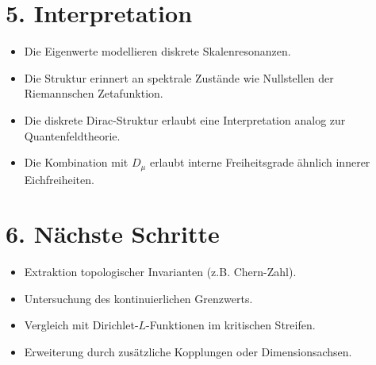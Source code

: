 \documentclass[11pt]{article}
\begin{document}
\section*{5. Interpretation}
\begin{itemize}
\item Die Eigenwerte modellieren diskrete Skalenresonanzen.
\item Die Struktur erinnert an spektrale Zustände wie Nullstellen der Riemannschen Zetafunktion.
\item Die diskrete Dirac-Struktur erlaubt eine Interpretation analog zur Quantenfeldtheorie.
\item Die Kombination mit $D_\mu$ erlaubt interne Freiheitsgrade ähnlich innerer Eichfreiheiten.
\end{itemize}

\section*{6. Nächste Schritte}
\begin{itemize}
\item Extraktion topologischer Invarianten (z.B. Chern-Zahl).
\item Untersuchung des kontinuierlichen Grenzwerts.
\item Vergleich mit Dirichlet-$L$-Funktionen im kritischen Streifen.
\item Erweiterung durch zusätzliche Kopplungen oder Dimensionsachsen.
\end{itemize}
\end{document}
